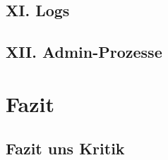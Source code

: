 \documentclass{beamer}
\begin{document}
			\subsection{XI. Logs}
			\subsection{XII. Admin-Prozesse}
		\section{Fazit}
			\subsection{Fazit uns Kritik}
\end{document}
